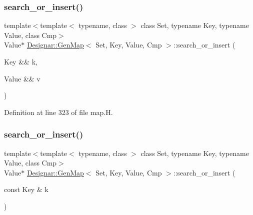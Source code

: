 \mbox{\label{class_designar_1_1_gen_map_a3244d12da4c9186ea2c1eef6ad0cbdc9}} 
\subsubsection{\texorpdfstring{search\+\_\+or\+\_\+insert()}{search\_or\_insert()}\hspace{0.1cm}{\footnotesize\ttfamily [4/6]}}
{\footnotesize\ttfamily template$<$template$<$ typename, class $>$ class Set, typename Key, typename Value, class Cmp$>$ \\
Value$\ast$ \hyperlink{class_designar_1_1_gen_map}{Designar\+::\+Gen\+Map}$<$ Set, Key, Value, Cmp $>$\+::search\+\_\+or\+\_\+insert (\begin{DoxyParamCaption}\item[{Key \&\&}]{k,  }\item[{Value \&\&}]{v }\end{DoxyParamCaption})\hspace{0.3cm}{\ttfamily [inline]}}



Definition at line 323 of file map.\+H.

\mbox{\label{class_designar_1_1_gen_map_a4ccec29a17c547692c25f3185187d7bd}} 
\subsubsection{\texorpdfstring{search\+\_\+or\+\_\+insert()}{search\_or\_insert()}\hspace{0.1cm}{\footnotesize\ttfamily [5/6]}}
{\footnotesize\ttfamily template$<$template$<$ typename, class $>$ class Set, typename Key, typename Value, class Cmp$>$ \\
Value$\ast$ \hyperlink{class_designar_1_1_gen_map}{Designar\+::\+Gen\+Map}$<$ Set, Key, Value, Cmp $>$\+::search\+\_\+or\+\_\+insert (\begin{DoxyParamCaption}\item[{const Key \&}]{k }\end{DoxyParamCaption})\hspace{0.3cm}{\ttfamily [inline]}}



